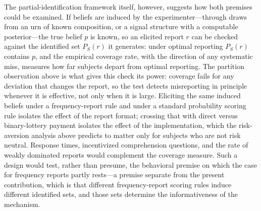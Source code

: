 The partial-identification framework itself, however, suggests how both premises could be examined.
If beliefs are induced by the experimenter---through draws from an urn of known composition, or a signal structure with a computable posterior---the true belief \(p\) is known, so an elicited report \(r\) can be checked against the identified set \(P_S(r)\) it generates: under optimal reporting \(P_S(r)\) contains \(p\), and the empirical coverage rate, with the direction of any systematic miss, measures how far subjects depart from optimal reporting.
The partition observation above is what gives this check its power: coverage fails for any deviation that changes the report, so the test detects misreporting in principle whenever it is effective, not only when it is large.
Eliciting the same induced beliefs under a frequency-report rule and under a standard probability scoring rule isolates the effect of the report format; crossing that with direct versus binary-lottery payment isolates the effect of the implementation, which the risk-aversion analysis above predicts to matter only for subjects who are not risk neutral.
Response times, incentivized comprehension questions, and the rate of weakly dominated reports would complement the coverage measure.
Such a design would test, rather than presume, the behavioral premise on which the case for frequency reports partly rests---a premise separate from the present contribution, which is that different frequency-report scoring rules induce different identified sets, and those sets determine the informativeness of the mechanism.

